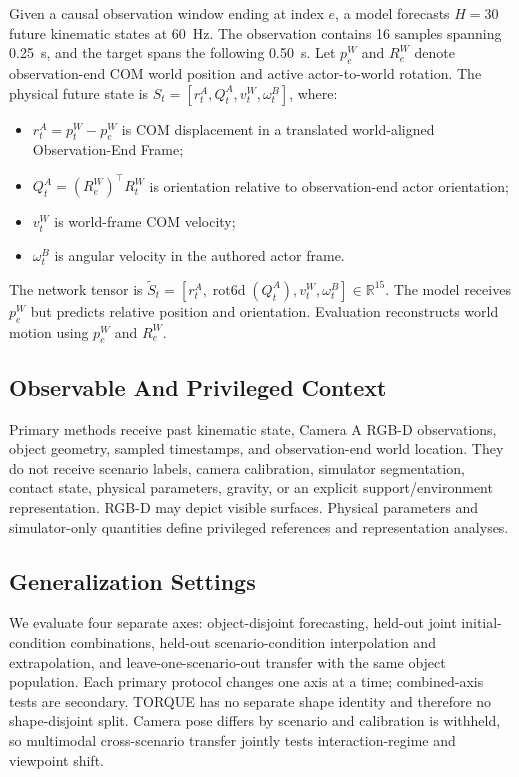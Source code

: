 \documentclass{article}
\begin{document}
Given a causal observation window ending at index $e$, a model forecasts $H=30$ future kinematic states at 60~Hz. The observation contains 16 samples spanning 0.25~s, and the target spans the following 0.50~s. Let $p_e^W$ and $R_e^W$ denote observation-end COM world position and active actor-to-world rotation. The physical future state is $S_t=[r_t^A,Q_t^A,v_t^W,\omega_t^B]$, where:
\begin{itemize}
    \item $r_t^A=p_t^W-p_e^W$ is COM displacement in a translated world-aligned Observation-End Frame;
    \item $Q_t^A=(R_e^W)^\top R_t^W$ is orientation relative to observation-end actor orientation;
    \item $v_t^W$ is world-frame COM velocity;
    \item $\omega_t^B$ is angular velocity in the authored actor frame.
\end{itemize}
The network tensor is $\widetilde S_t=[r_t^A,\operatorname{rot6d}(Q_t^A),v_t^W,\omega_t^B]\in\mathbb{R}^{15}$. The model receives $p_e^W$ but predicts relative position and orientation. Evaluation reconstructs world motion using $p_e^W$ and $R_e^W$.

\subsection{Observable And Privileged Context}

Primary methods receive past kinematic state, Camera A RGB-D observations, object geometry, sampled timestamps, and observation-end world location. They do not receive scenario labels, camera calibration, simulator segmentation, contact state, physical parameters, gravity, or an explicit support/environment representation. RGB-D may depict visible surfaces. Physical parameters and simulator-only quantities define privileged references and representation analyses.

\subsection{Generalization Settings}

We evaluate four separate axes: object-disjoint forecasting, held-out joint initial-condition combinations, held-out scenario-condition interpolation and extrapolation, and leave-one-scenario-out transfer with the same object population. Each primary protocol changes one axis at a time; combined-axis tests are secondary. TORQUE has no separate shape identity and therefore no shape-disjoint split. Camera pose differs by scenario and calibration is withheld, so multimodal cross-scenario transfer jointly tests interaction-regime and viewpoint shift.
\end{document}
